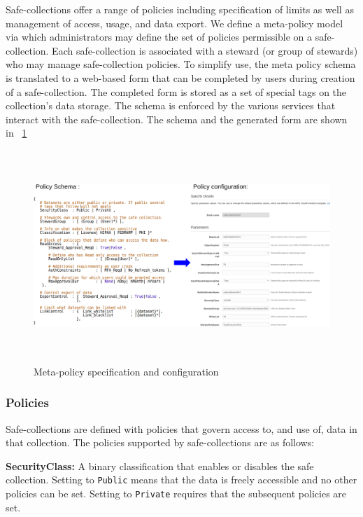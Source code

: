 Safe-collections offer a range of policies including specification of limits as well as management 
of access, usage, and data export. We define a meta-policy model via which administrators may define
the set of policies permissible on a safe-collection. Each safe-collection is associated with a steward
(or group of stewards) who may manage safe-collection policies. To simplify use, the meta policy schema 
is translated to a web-based form that can be completed by users during creation of a safe-collection. 
The completed form is stored as a set of special tags on the collection's data storage. The schema is enforced
by the various services that interact with the safe-collection. The schema and the generated form are shown in
\figurename~\ref{fig:schema}

\begin{figure}[ht]
  \center
  \includegraphics[width=\textwidth, height=8cm]{figures/meta-policy.png}
  \caption{Meta-policy specification and configuration}
  \vspace{-1.5em}
  \label{fig:schema}
\end{figure}

\subsubsection{Policies}
Safe-collections are defined with policies that govern access to, and use of, 
data in that collection. The policies supported by safe-collections are as 
follows: 

\textbf{SecurityClass:} A binary classification that enables or disables
the safe collection. Setting to \texttt{Public} means that the data is freely
accessible and no other policies can be set.  Setting to \texttt{Private}
requires that the subsequent policies are set. 

